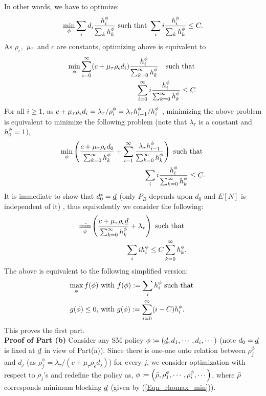 In other words, we have to optimize: 
\begin{eqnarray*}
	\min_\phi    \sum_i d_i \frac {h_i^{\phi} }{ \sum_k h_k^{\phi} } \mbox{ such that }  
	\sum_i   i \frac {h_i^{\phi} }{ \sum_k h_k^{\phi} }  \le C.
\end{eqnarray*} 
%
As $\rho_\epsilon,$ $ {\mu_\tau}$ and $c$ are constants, optimizing above is equivalent to 
\begin{eqnarray*}
	\min_\phi   \sum_{i=0}^\infty (c + {\mu_\tau} \rho_\epsilon d_i)  \frac {h_i^{\phi} }{ \sum_{k=0}^\infty h_k^{\phi} }  \ \ \mbox{ such that } \\
	\sum_{i=0}^\infty   i \frac {h_i^{\phi} }{ \sum_{k=0}^\infty h_k^{\phi}  }  \le C.
\end{eqnarray*} 
%
For all $i \ge 1$, as $c + {\mu_\tau} \rho_\epsilon d_i = \lambda_\tau / \rho_i^\phi =  \lambda_\tau  h_{i-1}^{\phi} / h_i^{\phi} $ , minimizing  the above problem is equivalent to minimize the following problem (note that $\lambda_\tau$ is a constant and $h_0^\phi = 1$), 
\begin{eqnarray*}
	\min_\phi    \left (   \frac{c + {\mu_\tau} \rho_\epsilon d_0}{ \sum_{k=0}^\infty h_k^{\phi}  } +   \sum_{i=1}^\infty   \frac {\lambda_\tau h_{i-1}^{\phi} }{ \sum_{k=0}^\infty h_k^{\phi} } \right ) \mbox{ such that } \\
	\sum_i   i \frac {h_i^{\phi} }{ \sum_{k=0}^\infty h_k^{\phi} }  \le C.
\end{eqnarray*} 
%
It is immediate to show that $d_0^* = {\underline d}$ (only $P_B$ depends upon $d_0$ and $E[N]$ is independent of it) , thus equivalently we consider the following:
\begin{eqnarray*}
	\min_\phi    \left (   \frac{c + {\mu_\tau} \rho_\epsilon {\underline d} }{  \sum_{k=0}^\infty h_k ^{\phi} } + \lambda_\tau \right ) \mbox{ such that } \\
	\sum_i   i  h_i^{\phi}   \le C  \sum_{k=0}^\infty h_k^{\phi}.
\end{eqnarray*} 
%
The above is equivalent to the following simplified version: 
\begin{eqnarray}
\max_\phi    f(\phi)  &\mbox{ with } f(\phi) := \sum_i h_i^{\phi}  \mbox{ such that } \nonumber \\
g(\phi) \le 0,  &\mbox{ with } g(\phi) :=  \sum_{i=0}^\infty    (i-C)  h_i^{\phi}  .
\label{Final_optimal}
\end{eqnarray} 
This proves the first part.\\
%
%
%
%
%
 \textbf{Proof of Part (b)}
Consider any SM policy $\phi \coloneqq \left({\underline d}, d_1, \cdots, d_i, \cdots \right )$ (note $d_0 = {\underline d}$ is fixed at ${\underline d}$ in view of Part(a)). Since there is one-one onto relation between $\rho_j^\phi$ and $d_j$ (as $\rho_j^\phi =  \lambda_{\tau} / (c + \mu_\tau \rho_\epsilon d_{j})$) for every $j$, we consider optimization with respect to $\rho_j$'s	 and  redefine the policy as, $\phi \coloneqq \left({\bar \rho}, \rho_1^\phi, \cdots, \rho_i^\phi, \cdots \right )$, where ${\bar \rho}$ corresponds minimum blocking ${\underline d}$ (given by (\ref{Eqn_rhomax_min})). 

